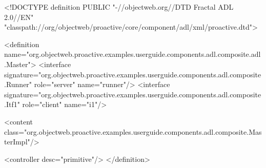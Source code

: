 <!DOCTYPE definition PUBLIC "-//objectweb.org//DTD Fractal ADL 2.0//EN" "classpath://org/objectweb/proactive/core/component/adl/xml/proactive.dtd">

<definition name="org.objectweb.proactive.examples.userguide.components.adl.composite.adl.Master">
  <interface signature="org.objectweb.proactive.examples.userguide.components.adl.composite.Runner" role="server" name="runner"/>
  <interface signature="org.objectweb.proactive.examples.userguide.components.adl.composite.Itf1" role="client" name="i1"/>

  <content class="org.objectweb.proactive.examples.userguide.components.adl.composite.MasterImpl"/>

  <controller desc="primitive"/>
</definition>